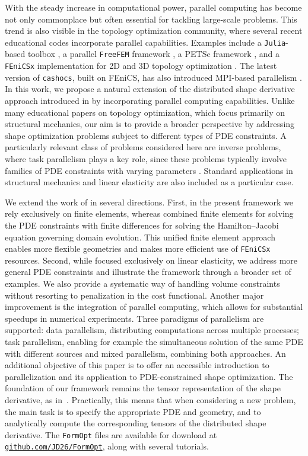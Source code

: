 \documentclass[preprint,9pt]{elsarticle}
\begin{document}
With the steady increase in computational power, parallel
computing has become not only commonplace but often essential
for tackling large-scale problems. 
This trend is also visible in the topology optimization community,
where several recent educational codes incorporate parallel capabilities. 
Examples include a \texttt{Julia}-based toolbox \cite{Wegert2025},
a parallel \texttt{FreeFEM} framework \cite{MR4916810}, a PETSc
framework \cite{MR3334238}, and a \texttt{FEniCSx} implementation for
2D and 3D topology optimization \cite{Jia2024}.
The latest version of \texttt{cashocs}, built on FEniCS, has also introduced
MPI-based parallelism \cite{BLAUTH2021100646,BLAUTH2023101577}.
In this work, we propose a natural extension of the distributed
shape derivative approach introduced in \cite{MR3843884}
by incorporating parallel computing capabilities.
Unlike many educational papers on topology optimization, which
focus primarily on structural mechanics, our aim is to provide
a broader perspective by addressing shape optimization problems
subject to different types of PDE constraints.
A particularly relevant class of problems considered here are
inverse problems, where task parallelism plays a key role,
since these problems typically involve families of PDE
constraints with varying parameters \cite{MR4261115}.
Standard applications in  structural mechanics and linear
elasticity are also included as a particular case.

We extend the work of \cite{MR3843884} in several directions. 
First, in the present framework we rely exclusively on finite elements,
whereas \cite{MR3843884} combined finite elements for solving the PDE
constraints with finite differences for solving the Hamilton--Jacobi
equation governing domain evolution. This unified finite element
approach enables more flexible geometries and makes more efficient
use of \texttt{FEniCSx} resources.
Second, while \cite{MR3843884} focused exclusively on linear elasticity,
we address more general PDE constraints and illustrate
the framework through a broader set of examples. 
We also provide a systematic way of handling volume constraints without
resorting to penalization in the cost functional.
Another major improvement is the integration of parallel computing,
which allows for substantial speedups in numerical experiments. 
Three paradigms of parallelism are supported: data parallelism,
distributing computations across multiple processes; task parallelism,
enabling for example the simultaneous solution of the same PDE
with different sources and mixed parallelism, combining both approaches.
An additional objective of this paper is to offer an accessible
introduction to parallelization and its application to
PDE-constrained shape optimization.
The foundation of our framework remains the tensor representation of
the shape derivative, as in~\cite{MR3843884}. Practically,
this means that when considering a new problem, the main task
is to specify the appropriate PDE and geometry, and to analytically
compute the corresponding tensors of the distributed shape derivative.
The \texttt{FormOpt} files are available for download at 
\href{https://github.com/JD26/FormOpt}{\texttt{github.com/JD26/FormOpt}}, 
along with several tutorials.
\end{document}
